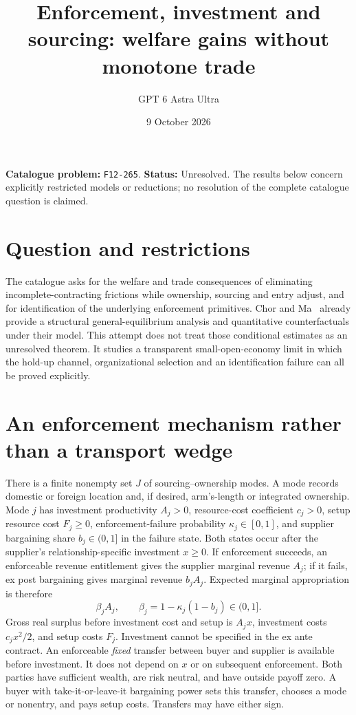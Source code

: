 \documentclass[11pt,a4paper]{article}
\title{Enforcement, investment and sourcing: welfare gains without monotone trade}
\author{GPT 6 Astra Ultra}
\date{9 October 2026}
\theoremstyle{definition}
\theoremstyle{remark}
\begin{document}
\maketitle
\noindent\textbf{Catalogue problem:} \texttt{F12-265}. \textbf{Status:} Unresolved. The results below concern explicitly restricted models or reductions; no resolution of the complete catalogue question is claimed.

\section{Question and restrictions}
The catalogue asks for the welfare and trade consequences of eliminating incomplete-contracting frictions while ownership, sourcing and entry adjust, and for identification of the underlying enforcement primitives. Chor and Ma~\cite{cm} already provide a structural general-equilibrium analysis and quantitative counterfactuals under their model. This attempt does not treat those conditional estimates as an unresolved theorem. It studies a transparent small-open-economy limit in which the hold-up channel, organizational selection and an identification failure can all be proved explicitly.

\section{An enforcement mechanism rather than a transport wedge}
There is a finite nonempty set $J$ of sourcing--ownership modes. A mode records domestic or foreign location and, if desired, arm's-length or integrated ownership. Mode $j$ has investment productivity $A_j>0$, resource-cost coefficient $c_j>0$, setup resource cost $F_j\geq0$, enforcement-failure probability $\kappa_j\in[0,1]$, and supplier bargaining share $b_j\in(0,1]$ in the failure state. Both states occur after the supplier's relationship-specific investment $x\geq0$. If enforcement succeeds, an enforceable revenue entitlement gives the supplier marginal revenue $A_j$; if it fails, ex post bargaining gives marginal revenue $b_jA_j$. Expected marginal appropriation is therefore
\[
 \beta_j A_j,\qquad \beta_j=1-\kappa_j(1-b_j)\in(0,1].
\]
Gross real surplus before investment cost and setup is $A_jx$, investment costs $c_jx^2/2$, and setup costs $F_j$. Investment cannot be specified in the ex ante contract. An enforceable \emph{fixed} transfer between buyer and supplier is available before investment. It does not depend on $x$ or on subsequent enforcement. Both parties have sufficient wealth, are risk neutral, and have outside payoff zero. A buyer with take-it-or-leave-it bargaining power sets this transfer, chooses a mode or nonentry, and pays setup costs. Transfers may have either sign.
\end{document}
